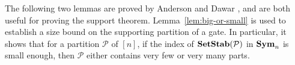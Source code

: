 \documentclass[../paper.tex]{subfiles}
\begin{document}



The following two lemmas are proved by Anderson and Dawar \cite{AndersonD17},
and are both useful for proving the support theorem.
Lemma~\ref{lem:big-or-small} is used to establish a size bound on the supporting
partition of a gate. In particular, it shows that for a partition $\mathcal{P}$
of $[n]$, if the index of $\text{\textbf{SetStab}} (\mathcal{P})$ in $\text{\textbf{Sym}}_n$ is small enough,
then $\mathcal{P}$ either contains very few or very many parts.
\end{document}
